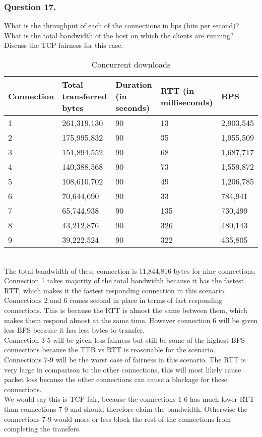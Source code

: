 \documentclass{mall}
\begin{document}
\subsubsection{Question 17.}
What is the throughput of each of the connections in bps (bits per second)? What is the total bandwidth of the host on which the clients are running? Discuss the TCP fairness for this case.\\
\begin{table}[ht]
\centering
\begin{tabular}{lllll}
 
Connection & Total transferred bytes & Duration (in seconds) & RTT (in milliseconds) & BPS\\\hline
1&	261,319,130&	90&	13 & 2,903,545\\\hline
2&	175,995,832&	90&	35 & 1,955,509\\\hline
3&	151,894,552&	90&	68 & 1,687,717\\\hline
4&	140,388,568&	90&	73 & 1,559,872\\\hline
5&	108,610,702&	90&	49 & 1,206,785\\\hline
6&	70,644,690&	90&	33 & 784,941\\\hline
7&	65,744,938&	90&	135 & 730,499\\\hline
8&	43,212,876&	90&	326 & 480,143\\\hline
9&	39,222,524&	90&	322 & 435,805\\\hline
\end{tabular}
\caption{Concurrent downloads}
\end{table}\\
The total bandwidth of these connection is 11,844,816 bytes for nine connections.\\
Connection 1 takes majority of the total bandwidth because it has the fastest RTT, which makes it the fastest responding connection in this scenario. \\
Connections 2 and 6 comes second in place in terms of fast responding connections. This is because the RTT is almost the same between them, which makes them respond almost at the same time. However connection 6 will be given less BPS because it has less bytes to transfer.\\
Connection 3-5 will be given less fairness but still be some of the highest BPS connections because the TTB vs RTT is reasonable for the scenario.\\
Connections 7-9 will be the worst case of fairness in this scenario. The RTT is very large in comparison to the other connections, this will most likely cause packet loss because the other connections can cause a blockage for these connections. \\
We would say this is TCP fair, because the connections 1-6 has much lower RTT than connections 7-9 and should therefore claim the bandwidth. Otherwise the connections 7-9 would more or less block the rest of the connections from completing the transfers.\\
\end{document}
